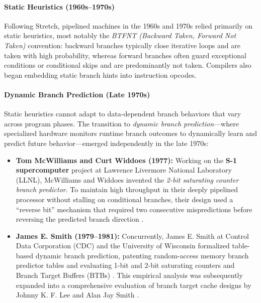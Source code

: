 \paragraph{Static Heuristics (1960s--1970s)}
Following Stretch, pipelined machines in the 1960s and 1970s relied primarily on static heuristics, most notably the \textit{BTFNT (Backward Taken, Forward Not Taken)} convention: backward branches typically close iterative loops and are taken with high probability, whereas forward branches often guard exceptional conditions or conditional skips and are predominantly not taken. Compilers also began embedding static branch hints into instruction opcodes.

\paragraph{Dynamic Branch Prediction (Late 1970s)}
Static heuristics cannot adapt to data-dependent branch behaviors that vary across program phases. The  transition to \textit{dynamic branch prediction}---where specialized hardware monitors runtime branch outcomes to dynamically learn and predict future behavior---emerged independently in the late 1970s:
\begin{itemize}
    \item \textbf{Tom McWilliams and Curt Widdoes (1977):} Working on the \textbf{S-1 supercomputer} project at Lawrence Livermore National Laboratory (LLNL), McWilliams and Widdoes invented the \textit{2-bit saturating counter branch predictor}. To maintain high throughput in their deeply pipelined processor without stalling on conditional branches, their design used a ``reverse bit'' mechanism that required two consecutive mispredictions before reversing the predicted branch direction \cite{s1project1979}.
    
    \item \textbf{James E. Smith (1979--1981):} Concurrently, James E. Smith at Control Data Corporation (CDC) and the University of Wisconsin formalized table-based dynamic branch prediction, patenting random-access memory branch predictor tables and evaluating 1-bit and 2-bit saturating counters and Branch Target Buffers (BTBs) \cite{smith1981study, smith1983patent}. This empirical analysis was subsequently expanded into a comprehensive evaluation of branch target cache designs by Johnny K. F. Lee and Alan Jay Smith \cite{lee1984branch}.
\end{itemize}


